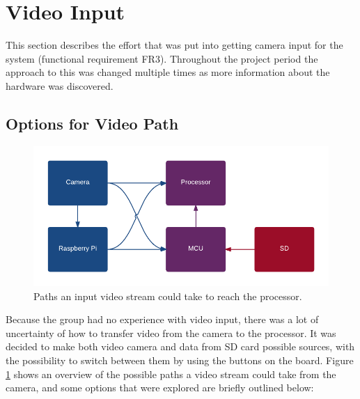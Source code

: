 \section{Video Input} \label{section_video}
This section describes the effort that was put into getting camera input for the system (functional requirement FR3).
Throughout the project period the approach to this was changed multiple times as more information about the hardware was discovered.




\subsection{Options for Video Path}
\begin{figure}
    \centering
    \includegraphics[width=\linewidth]{img/VideoPath}
    \caption{Paths an input video stream could take to reach the processor.}
    \label{fig:VideoPath}
\end{figure}

Because the group had no experience with video input,
there was a lot of uncertainty of how to transfer video from the camera to the processor.
It was decided to make both video camera and data from SD card possible sources,
with the possibility to switch between them by using the buttons on the board.
Figure \ref{fig:VideoPath} shows an overview of the possible paths a video stream could take from the camera,
and some options that were explored are briefly outlined below:

